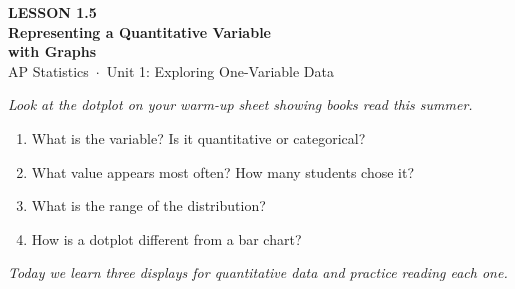 \documentclass[aspectratio=169, 11pt]{beamer}
\begin{document}
{
\begin{frame}[plain]
  \vspace{2.8cm}
  \hspace{0.55cm}%
  \begin{minipage}{0.9\textwidth}
    {\color{goldacc}\bfseries\small LESSON 1.5}\\[0.5cm]
    {\color{white}\bfseries\LARGE Representing a Quantitative Variable\\[0.25cm]
      with Graphs}\\[1.4cm]
    {\color{skymid}\small AP Statistics~$\cdot$~Unit 1: Exploring One-Variable Data}
  \end{minipage}
\end{frame}
}

{
\begin{frame}[t, plain]
  \hspace{0.55cm}%
  \begin{minipage}{0.9\textwidth}
    \vspace{0.3em}
    \small
    \textit{Look at the dotplot on your warm-up sheet showing books read this summer.}
    \begin{enumerate}
      \setlength{\itemsep}{0.6em}\setlength{\topsep}{0em}
      \item What is the variable? Is it quantitative or categorical?
      \item What value appears most often? How many students chose it?
      \item What is the range of the distribution?
      \item How is a dotplot different from a bar chart?
    \end{enumerate}
    \vspace{0.4cm}
    {\color{navy}\itshape\small
      Today we learn three displays for quantitative data and practice
      reading each one.}
  \end{minipage}
\end{frame}
}
\end{document}
